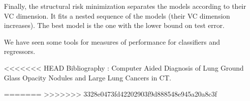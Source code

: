 \documentclass[a4paper,12pt]{article}
\begin{document}
Finally, the structural risk minimization separates the models according to their VC dimension. It fits a nested sequence of the models (their VC dimension increases). The best model is the one with the lower bound on test error.  

\vspace{10pt}
We have seen some tools for measures of performance for classifiers and regressors.
\vspace{60pt}

<<<<<<< HEAD
Bibliography : 
Computer Aided Diagnosis of Lung Ground Glass Opacity Nodules and Large Lung Cancers in CT.

=======
>>>>>>> 3328e0473fd42202903f9d888548e945a20a8c3f
\end{document}
